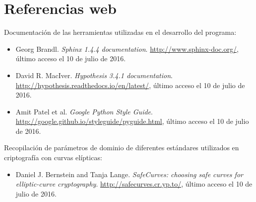 


\manualmark
\markboth{\spacedlowsmallcaps{\bibname}}{\spacedlowsmallcaps{\bibname}} %
{}
\label{app:bibliography}

\printbibliography


\cleardoublepage

\chapter*{Referencias web}

Documentación de las herramientas utilizadas en el desarrollo del programa:

\begin{itemize}
    \item Georg Brandl. \emph{Sphinx 1.4.4 documentation}. \url{http://www.sphinx-doc.org/}, último acceso el 10 de julio de 2016.
    \item David R. MacIver. \emph{Hypothesis 3.4.1 documentation}. \url{http://hypothesis.readthedocs.io/en/latest/}, último acceso el 10 de julio de 2016.
    \item Amit Patel et al. \emph{Google Python Style Guide}. \url{http://google.github.io/styleguide/pyguide.html}, último acceso el 10 de julio de 2016.
\end{itemize}

Recopilación de parámetros de dominio de diferentes estándares utilizados en criptografía con curvas elípticas:

\begin{itemize}
    \item Daniel J. Bernstein and Tanja Lange. \emph{SafeCurves: choosing safe curves for elliptic-curve cryptography}. \url{http://safecurves.cr.yp.to/}, último acceso el 10 de julio de 2016.
\end{itemize}

\label{app:bibliography end}
